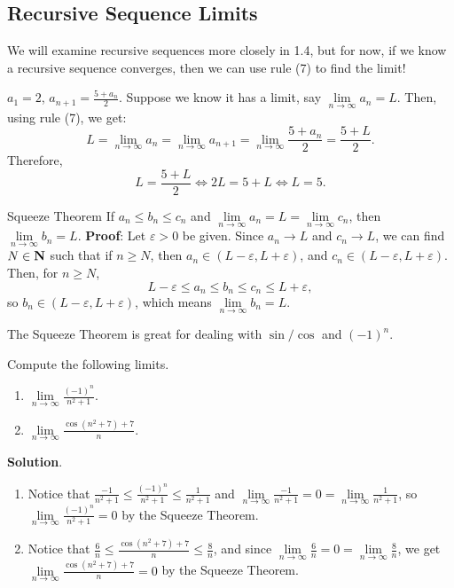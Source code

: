 \subsection*{Recursive Sequence Limits}
We will examine recursive sequences more closely in 1.4,
but for now, if we know a recursive sequence converges,
then we can use rule (7) to find the limit!
\begin{Example}{}{}
    $ a_1=2 $, $ a_{n+1}=\frac{5+a_n}{2} $.
    Suppose we know it has a limit, say $ \lim\limits_{{n} \to {\infty}}a_n=L $.
    Then, using rule (7), we get:
    \[ L=\lim\limits_{{n} \to {\infty}}a_n=
        \lim\limits_{{n} \to {\infty}}a_{n+1}=
        \lim\limits_{{n} \to {\infty}}\frac{5+a_n}{2}=
        \frac{5+L}{2}. \]
    Therefore,
    \[ L=\frac{5+L}{2}\iff 2L=5+L\iff L=5. \]
\end{Example}
\begin{Theorem}{Squeeze Theorem}{}
    If $ a_n\le b_n\le c_n $ and $ \lim\limits_{{n} \to {\infty}}a_n=L=\lim\limits_{{n} \to {\infty}}c_n $,
    then $ \lim\limits_{{n} \to {\infty}}b_n=L $.
    \tcblower{}
    \textbf{Proof}: Let $ \varepsilon>0 $ be given.
    Since $ a_n\to L $ and $ c_n\to L $, we can find $ N\in\mathbf{N} $
    such that if $ n\ge N $, then $ a_n\in(L-\varepsilon,L+\varepsilon) $,
    and $ c_n\in(L-\varepsilon,L+\varepsilon) $. Then, for $ n\ge N $,
    \[ L-\varepsilon\le a_n\le b_n\le c_n\le L+\varepsilon, \]
    so $ b_n\in (L-\varepsilon,L+\varepsilon) $, which means
    $ \lim\limits_{{n} \to {\infty}}b_n=L $.
\end{Theorem}
\begin{Remark}{}{}
    The Squeeze Theorem is great for dealing with $ \sin/\cos $
    and $ (-1)^n $.
\end{Remark}
\begin{Example}{}{}
    Compute the following limits.
    \begin{enumerate}[(1)]
        \item $ \lim\limits_{{n} \to {\infty}}\frac{(-1)^n}{n^2+1} $.
        \item $ \lim\limits_{{n} \to {\infty}}\frac{\cos(n^2+7)+7}{n} $.
    \end{enumerate}
    \tcblower{}
    \textbf{Solution}.
    \begin{enumerate}[(1)]
        \item Notice that $ \frac{-1}{n^2+1}\le \frac{(-1)^n}{n^2+1}\le \frac{1}{n^2+1} $
              and $ \lim\limits_{{n} \to {\infty}}\frac{-1}{n^2+1}=0=\lim\limits_{{n} \to {\infty}}\frac{1}{n^2+1} $,
              so $ \lim\limits_{{n} \to {\infty}}\frac{(-1)^n}{n^2+1}=0 $ by the Squeeze Theorem.
        \item Notice that $ \frac{6}{n}\le \frac{\cos(n^2+7)+7}{n}\le \frac{8}{n} $,
              and since $ \lim\limits_{{n} \to {\infty}}\frac{6}{n}=0=\lim\limits_{{n} \to {\infty}}\frac{8}{n} $,
              we get $ \lim\limits_{{n} \to {\infty}}\frac{\cos(n^2+7)+7}{n}=0 $ by the Squeeze Theorem.
    \end{enumerate}
\end{Example}
